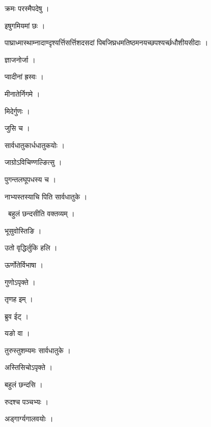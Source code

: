 \documentclass[10pt, openany, oneside]{book}
\begin{document}
\noindent क्रमः परस्मैपदेषु ।

\noindent इषुगमियमां छः ।

\noindent पाघ्राध्मास्थाम्नादाण्दृश्यर्त्तिसर्त्तिशदसदां पिबजिघ्रधमतिष्ठमनयच्छपश्यर्च्छधौशीयसीदाः ।

\noindent ज्ञाजनोर्जा ।

\noindent प्वादीनां ह्रस्वः ।

\noindent मीनातेर्निगमे ।

\noindent मिदेर्गुणः ।

\noindent जुसि च ।

\noindent सार्वधातुकार्धधातुकयोः ।

\noindent जाग्रोऽविचिण्णल्ङित्सु ।

\noindent पुगन्तलघूपधस्य च ।

\noindent नाभ्यस्तस्याचि पिति सार्वधातुके ।

\par\noindent\hspace{1.5em}{\vps वा॰}~{\qt बहुलं छन्दसीति वक्तव्यम् ।}

\noindent भूसुवोस्तिङि ।

\noindent उतो वृद्धिर्लुकि हलि ।

\noindent ऊर्णोतेर्विभाषा ।

\noindent गुणोऽपृक्ते ।

\noindent तृणह इम् ।

\noindent ब्रुव ईट् ।

\noindent यङो वा ।

\noindent तुरुस्तुशम्यमः सार्वधातुके ।

\noindent अस्तिसिचोऽपृक्ते ।

\noindent बहुलं छन्दसि ।

\noindent रुदश्च पञ्चभ्यः ।

\noindent अड्गार्ग्यगालवयोः ।
\end{document}
